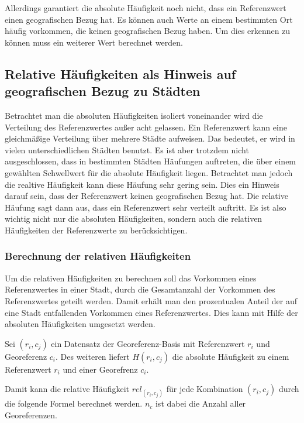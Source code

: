 			Allerdings garantiert die absolute Häufigkeit noch nicht, dass ein Referenzwert einen geografischen Bezug hat. 
			Es können auch Werte an einem bestimmten Ort häufig vorkommen, die keinen geografischen Bezug haben.
			Um dies erkennen zu können muss ein weiterer Wert berechnet werden.

		\subsection{Relative Häufigkeiten als Hinweis auf geografischen Bezug zu Städten}

			Betrachtet man die absoluten Häufigkeiten isoliert voneinander wird die Verteilung des Referenzwertes außer acht gelassen. 
			Ein Referenzwert kann eine gleichmäßige Verteilung über mehrere Städte aufweisen.
			Das bedeutet, er wird in vielen unterschiedlichen Städten benutzt. 
			Es ist aber trotzdem nicht ausgeschlossen, dass in bestimmten Städten Häufungen auftreten, die über einem gewählten Schwellwert für die absolute Häufigkeit liegen.
			Betrachtet man jedoch die realtive Häufigkeit kann diese Häufung sehr gering sein.
			Dies ein Hinweis darauf sein, dass der Referenzwert keinen geografischen Bezug hat.
			Die relative Häufung sagt dann aus, dass ein Referenzwert sehr verteilt auftritt. 
			Es ist also wichtig nicht nur die absoluten Häufigkeiten, sondern auch die relativen Häufigkeiten der Referenzwerte zu berücksichtigen.

			\subsubsection{Berechnung der relativen Häufigkeiten}  

				Um die relativen Häufigkeiten zu berechnen soll das Vorkommen eines Referenzwertes in einer Stadt, durch die Gesamtanzahl der Vorkommen des Referenzwertes geteilt werden.
				Damit erhält man den prozentualen Anteil der auf eine Stadt entfallenden Vorkommen eines Referenzwertes.
				Dies kann mit Hilfe der absoluten Häufigkeiten umgesetzt werden.

				Sei $(r_i,c_j)$ ein Datensatz der Georeferenz-Basis mit Referenzwert $r_i$ und Georeferenz $c_i$.
				Des weiteren liefert $H(r_{i},c_{j})$ die absolute Häufigkeit zu einem Referenzwert $r_i$ und einer Georefrenz $c_i$. 

				Damit kann die relative Häufigkeit $rel_{(r_i,c_j)}$ für jede Kombination $(r_i,c_j)$ durch die folgende Formel berechnet werden. 
				$n_c$ ist dabei die Anzahl aller Georeferenzen.


